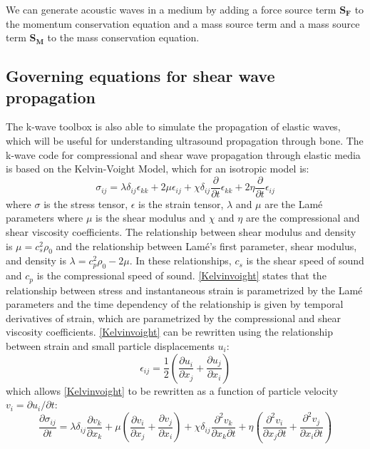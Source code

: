 \documentclass[10pt,a4paper]{article}
\begin{document}
We can generate acoustic waves in a medium by adding a force source term \textbf{S$_\textbf{F}$} to the momentum conservation equation and a mass source term and a mass source term \textbf{S$_\textbf{M}$} to the mass conservation equation.

\subsection*{Governing equations for shear wave propagation}

The k-wave toolbox is also able to simulate the propagation of elastic waves, which will be useful for understanding ultrasound propagation through bone. The k-wave code for compressional and shear wave propagation through elastic media is based on the Kelvin-Voight Model, which for an isotropic model is:
\begin{equation} \label{Kelvinvoight}
\sigma_{ij} = \lambda \delta_{ij} \epsilon_{kk} + 2 \mu \epsilon_{ij} + \chi \delta_{ij} \dfrac{\partial}{\partial t} \epsilon_{kk} + 2 \eta \dfrac{\partial}{\partial t} \epsilon_{ij} 
\end{equation}
where $\sigma$ is the stress tensor, $\epsilon$ is the strain tensor, $\lambda$ and $\mu$ are the Lam\'{e} parameters where $\mu$ is the shear modulus and $\chi$ and $\eta$ are the compressional and shear viscosity coefficients. The relationship between shear modulus and density is $\mu = c_s^2\rho_0$ and the relationship between Lam\'{e}'s first parameter, shear modulus, and density is $\lambda = c_p^2 \rho_0 - 2 \mu$. In these relationships, $c_s$ is the shear speed of sound and $c_p$ is the compressional speed of sound. \autoref{Kelvinvoight} states that the relationship between stress and instantaneous strain is parametrized by the Lam\'{e} parameters and the time dependency of the relationship is given by temporal derivatives of strain, which are parametrized by the compressional and shear viscosity coefficients. \autoref{Kelvinvoight} can be rewritten using the relationship between strain and small particle displacements $u_i$:
\begin{equation}
\epsilon_{ij} = \dfrac{1}{2} \left(\dfrac{\partial u_i}{\partial x_j} + \dfrac{\partial u_j}{\partial x_i} \right)
\end{equation}
which allows \autoref{Kelvinvoight} to be rewritten as a function of particle velocity $v_i = \partial u_i / \partial t$:
\begin{equation} \label{Kelvinvoightvelocity}
\dfrac{\partial \sigma_{ij}}{\partial t} = \lambda \delta_{ij} \dfrac{\partial v_k}{\partial x_k} + \mu \left( \dfrac{\partial v_i}{\partial x_j} + \dfrac{\partial v_j}{\partial x_i} \right) + \chi \delta_{ij} \dfrac{\partial^2 v_k}{\partial x_k \partial t} + \eta \left(\dfrac{\partial^2 v_i}{\partial x_j \partial t} + \dfrac{\partial^2 v_j}{\partial x_i \partial t} \right) 
\end{equation}
\end{document}
